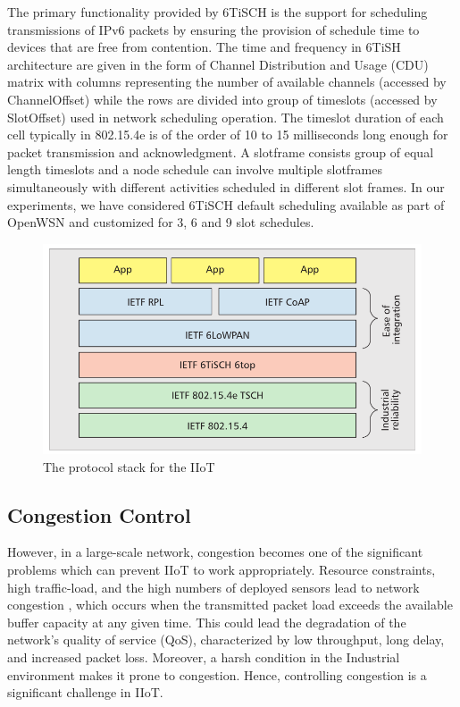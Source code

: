 The primary functionality provided by 6TiSCH is the support for scheduling transmissions of IPv6 packets by ensuring the provision of schedule time to devices that are free from contention. The time and frequency in 6TiSH architecture are given in the form of Channel Distribution and Usage (CDU) matrix \cite{DeGuglielmo2014, 7442080, 7254107, DUY201780} with columns representing the number of available channels (accessed by ChannelOffset) while the rows are divided into group of timeslots (accessed by SlotOffset) used in network scheduling operation. The timeslot duration of each cell typically in 802.15.4e is of the order of 10 to 15 milliseconds long enough for packet transmission and acknowledgment. A slotframe consists group of equal length timeslots and a node schedule can involve multiple slotframes simultaneously with different activities scheduled in different slot frames. In our experiments, we have considered 6TiSCH default scheduling available as part of OpenWSN and customized for 3, 6 and 9 slot schedules.

\begin{figure}
	\centering
	\includegraphics[width=1\linewidth]{pics/jaran}
	\caption{The protocol stack for the IIoT}
	\label{fig:jaran}
\end{figure}

\subsection{Congestion Control}

However, in a large-scale network, congestion becomes one of the significant problems which can prevent IIoT to work appropriately. Resource constraints, high traffic-load, and the high numbers of deployed sensors lead to network congestion \cite{GHAFFARI2015101}, which occurs when the transmitted packet load exceeds the available buffer capacity at any given time. This could lead the degradation of the network's quality of service (QoS), characterized by low throughput, long delay, and increased packet loss. Moreover, a harsh condition in the Industrial environment makes it prone to congestion. Hence, controlling congestion is a significant challenge in IIoT.

